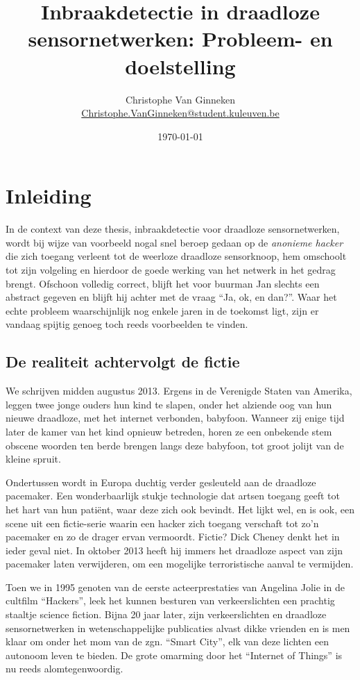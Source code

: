 \documentclass[12pt,a4paper]{article}
\author{Christophe Van Ginneken\\\url{Christophe.VanGinneken@student.kuleuven.be}}
\title{Inbraakdetectie in draadloze sensornetwerken: Probleem- en doelstelling}
\date{\today}
\begin{document}
\maketitle

\section*{Inleiding}

In de context van deze thesis, inbraakdetectie voor draadloze sensornetwerken,
wordt bij wijze van voorbeeld nogal snel beroep gedaan op de \emph{anonieme
hacker} die zich toegang verleent tot de weerloze draadloze sensorknoop, hem
omschoolt tot zijn volgeling en hierdoor de goede werking van het netwerk in
het gedrag brengt. Ofschoon volledig correct, blijft het voor buurman Jan
slechts een abstract gegeven en blijft hij achter met de vraag ``Ja, ok, en
dan?''. Waar het echte probleem waarschijnlijk nog enkele jaren in de toekomst
ligt, zijn er vandaag spijtig genoeg toch reeds voorbeelden te vinden.

\subsection*{De realiteit achtervolgt de fictie}

We schrijven midden augustus 2013. Ergens in de Verenigde Staten van Amerika,
leggen twee jonge ouders hun kind te slapen, onder het alziende oog van hun
nieuwe draadloze, met het internet verbonden, babyfoon. Wanneer zij enige tijd
later de kamer van het kind opnieuw betreden, horen ze een onbekende stem
obscene woorden ten berde brengen langs deze babyfoon, tot groot jolijt van de
kleine spruit.

Ondertussen wordt in Europa duchtig verder gesleuteld aan de draadloze
pacemaker. Een wonderbaarlijk stukje technologie dat artsen toegang geeft tot
het hart van hun pati\"ent, waar deze zich ook bevindt. Het lijkt wel, en is
ook, een scene uit een fictie-serie waarin een hacker zich toegang verschaft
tot zo'n pacemaker en zo de drager ervan vermoordt. Fictie? Dick Cheney denkt
het in ieder geval niet. In oktober 2013 heeft hij immers het draadloze aspect
van zijn pacemaker laten verwijderen, om een mogelijke terroristische aanval te
vermijden.

Toen we in 1995 genoten van de eerste acteerprestaties van Angelina Jolie in de
cultfilm ``Hackers'', leek het kunnen besturen van verkeerslichten een prachtig
staaltje science fiction. Bijna 20 jaar later, zijn verkeerslichten en
draadloze sensornetwerken in wetenschappelijke publicaties alvast dikke
vrienden en is men klaar om onder het mom van de zgn. ``Smart City'', elk van
deze lichten een autonoom leven te bieden. De grote omarming door het
``Internet of Things'' is nu reeds alomtegenwoordig.
\end{document}
